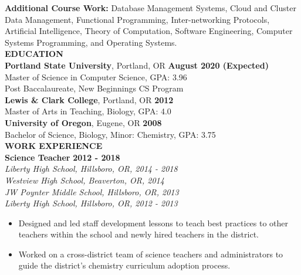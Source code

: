 \documentclass[11pt]{article}
\begin{document}
\smallskip
\textbf{Additional Course Work:} Database Management Systems, Cloud and Cluster Data Management, Functional Programming, Inter-networking Protocols, Artificial Intelligence, Theory of Computation, Software Engineering, Computer Systems Programming, and Operating Systems.\bigskip\\
\noindent
\makebox[0pt][l]{\rule[-.2\baselineskip]{\linewidth}{.3mm}}%
\large{\textbf{EDUCATION}} \smallskip \\
%
\textbf{Portland State University}, Portland, OR
\hfill \textbf{August 2020 (Expected)}\\ 
Master of Science in Computer Science, GPA: 3.96\\
Post Baccalaureate, New Beginnings CS Program %
\medskip \\
%
\textbf{Lewis \& Clark College}, Portland, OR
\hfill \textbf{2012} \\
Master of Arts in Teaching, Biology, GPA: 4.0\medskip \\
%
\textbf{University of Oregon}, Eugene, OR
\hfill \textbf{2008}\\
Bachelor of Science, Biology, Minor: Chemistry, GPA: 3.75 \bigskip \\
\makebox[0pt][l]{\rule[-.2\baselineskip]{\linewidth}{.3mm}}%
\large{\textbf{WORK EXPERIENCE}}\smallskip \\
%
\textbf{Science Teacher} \hfill \textbf{2012 - 2018}\\
\textit{Liberty High School, Hillsboro, OR, 2014 - 2018}\\
\textit{Westview High School, Beaverton, OR, 2014}\\
\textit{JW Poynter Middle School, Hillsboro, OR, 2013}\\
\textit{Liberty High School, Hillsboro, OR, 2012 - 2013}
\begin{itemize}[leftmargin=*, itemsep=0pt, topsep=5pt]
	\item Designed and led staff development lessons to teach best practices to other teachers within the school and newly hired teachers in the district.
	\item Worked on a cross-district team of science teachers and administrators to guide the district’s chemistry curriculum adoption process.
\end{itemize}
\end{document}
